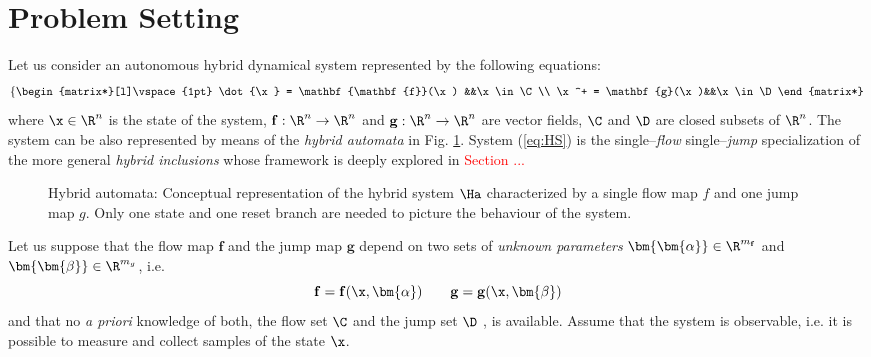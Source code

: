 \section{Problem Setting}\label{ProblemS}
Let us consider an autonomous hybrid dynamical system represented {by the following equations:}
%
\begin{equation}\label{eq:HS}
    \left\{ 
        \begin{matrix*}[l]\vspace{1pt}
            \dot{\x} = \mathbf{\mathbf{f}}(\x) &&\x\in\C\\
            \x^+ = \mathbf{g}(\x)&&\x\in\D
        \end{matrix*}
    \right.
\end{equation}
%
where $\x\in\R^n$ is the state of the system, $\mathbf{\mathbf{f}}:\R^n\rightarrow\R^n$ and $\mathbf{g}:\R^n\rightarrow\R^n$ are vector fields, $\C$ and $\D$ are closed subsets of $\R^n$.
The system can be also represented by means of the \textit{hybrid automata} in Fig. \ref{fig:HA}.      
System (\ref{eq:HS}) is the single--\textit{flow} single--\textit{jump} specialization of the more general \textit{hybrid inclusions} whose framework is deeply explored in \textcolor{red}{Section ...}%
%
\begin{figure}[!b]
	\centering
	\caption{Hybrid automata: Conceptual representation of the hybrid system $\Ha$ characterized by a single flow map $f$ and one jump map $g$. Only one state and one reset branch are needed to picture the behaviour of the system.}
	\label{fig:HA}
\end{figure}
%

Let us suppose that the flow map $\mathbf{\mathbf{f}}$ and the jump map $\mathbf{g}$ depend on two sets of \textit{unknown parameters} $\bm{\bm{\alpha}}\in\R^{m_\mathbf{f}}$ and $\bm{\bm{\beta}}\in\R^{m_g}$, i.e.
\[\mathbf{\mathbf{f}} = \mathbf{\mathbf{f}}(\x,\bm{\alpha})\qquad \mathbf{g} = \mathbf{g}(\x,\bm{\beta})\]
and that no \textit{a priori} knowledge of both, the flow set $\C$ and the jump set $\D$ , is available.
Assume that the system is observable, i.e. it is possible to measure and collect samples of the state $\x$.

